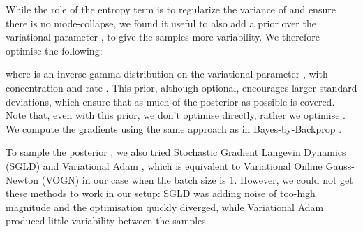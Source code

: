 \documentclass{article}
\newcommand{\fld}{results}
\newcommand{\valid}{validation}
\newcommand{\w}{2.5cm}
\begin{document}
While the role of the entropy term  is to regularize the variance of  and ensure there is no mode-collapse, we found it useful to also add a prior over the variational parameter , to give the samples more variability. We therefore optimise the following:
 
where  is an inverse gamma distribution on the variational parameter , with concentration  and rate . This prior, although optional, encourages larger standard deviations, which ensure that as much of the posterior as possible is covered. Note that, even with this prior, we don't optimise  directly, rather we optimise . We compute the gradients using the same approach as in Bayes-by-Backprop \cite{blundell2015weight}.

To sample the posterior , we also tried Stochastic Gradient Langevin Dynamics (SGLD) \cite{welling2011bayesian} and Variational Adam \cite{khan2018fast}, which is equivalent to Variational Online Gauss-Newton (VOGN) \cite{khan2018fast} in our case when the batch size is 1. However, we could not get these methods to work in our setup: SGLD was adding noise of too-high magnitude and the optimisation quickly diverged, while Variational Adam produced little variability between the samples.



\renewcommand{\w}{1.87cm}

\newcommand{\srXL}[1]{\fld/00608-recon-real-imagesxray_frontal_test-super-resolution/image#1-target} \newcommand{\srXB}[1]{\fld/00608-recon-real-imagesxray_frontal_test-super-resolution/bicubic-x4/image#1-target} \newcommand{\srXE}[1]{\valid/ESRGAN/results/xray_LLR/image#1-target_rlt} \newcommand{\srXS}[1]{\valid/SRFBN_CVPR19/results/SR/xray_LLR/SRFBN/x4/image#1-target} \newcommand{\srXO}[1]{\fld/00608-recon-real-imagesxray_frontal_test-super-resolution/clean_64/image#1-clean-step5000} \newcommand{\srXOF}[1]{\fld/00608-recon-real-imagesxray_frontal_test-super-resolution/image#1-clean-step5000} \newcommand{\srXH}[1]{\fld/00608-recon-real-imagesxray_frontal_test-super-resolution/image#1-true} 

\newcommand{\srXLtwo}[1]{\fld/00622-recon-real-imagesxray_frontal_test-super-resolution/image#1-target} \newcommand{\srXBtwo}[1]{\fld/00622-recon-real-imagesxray_frontal_test-super-resolution/bicubic-x4/image#1-target} \newcommand{\srXEtwo}[1]{\valid/ESRGAN/results/xray_LLR32x32/image#1-target_rlt} \newcommand{\srXStwo}[1]{\valid/SRFBN_CVPR19/results/SR/xray_LLR32x32/SRFBN/x4/image#1-target} \newcommand{\srXOtwo}[1]{\fld/00622-recon-real-imagesxray_frontal_test-super-resolution/clean_128/image#1-clean-step5000} \newcommand{\srXOFtwo}[1]{\fld/00622-recon-real-imagesxray_frontal_test-super-resolution/image#1-clean-step5000} \newcommand{\srXHtwo}[1]{\fld/00622-recon-real-imagesxray_frontal_test-super-resolution/image#1-true} 
\end{document}
